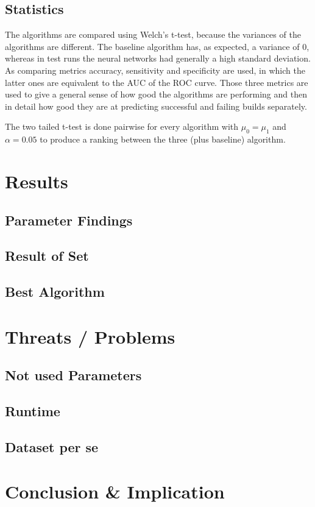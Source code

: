 \documentclass[a4paper,11pt]{article}
\begin{document}

\subsection{Statistics}

The algorithms are compared using Welch's t-test, because the variances of the algorithms are different. The baseline algorithm has, as expected, a variance of 0, whereas in test runs the neural networks had generally a high standard deviation. As comparing metrics accuracy, sensitivity and specificity are used, in which the latter ones are equivalent to the AUC of the ROC curve. Those three metrics are used to give a general sense of how good the algorithms are performing and then in detail how good they are at predicting successful and failing builds separately. 

The two tailed t-test is done pairwise for every algorithm with $\mu_0 = \mu_1$ and $\alpha=0.05$ to produce a ranking between the three (plus baseline) algorithm. 


\section{Results}

\subsection{Parameter Findings}

\subsection{Result of Set}

\subsection{Best Algorithm}

\section{Threats / Problems}

\subsection{Not used Parameters}
\subsection{Runtime}
\subsection{Dataset per se}

\section{Conclusion \& Implication}	




\end{document}
